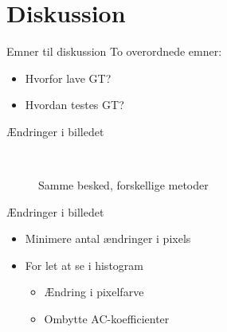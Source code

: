 \section{Diskussion} 
\begin{frame}{Emner til diskussion}
    To overordnede emner:
    \begin{itemize}
        \item Hvorfor lave GT?
        \item Hvordan testes GT?
    \end{itemize}
\end{frame}

\begin{frame}{Ændringer i billedet}
    \begin{figure}
        \centering
        \begin{center}
        \end{center}
        ~
        ~
        \caption{Samme besked, forskellige metoder}
    \end{figure}
\end{frame}

\begin{frame}{Ændringer i billedet}
    \begin{itemize}
        \setlength\itemsep{1em}
        \item Minimere antal ændringer i pixels
        \item For let at se i histogram
        \begin{itemize}
            \vspace*{1em}
            \setlength\itemsep{1em}
            \item<con@1->[$\times$] Ændring i pixelfarve
            \item<pro@1->[\checkmark] Ombytte AC-koefficienter
        \end{itemize}
    \end{itemize}
\end{frame}


